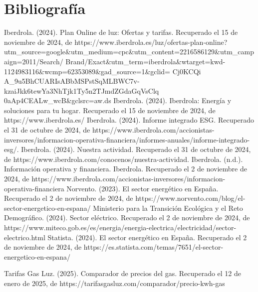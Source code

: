 \documentclass{article}
\begin{document}
\section{Bibliografía}
\begin{thebibliography}{9}
\bibitem{}
Iberdrola. (2024). Plan Online de luz: Ofertas y tarifas. Recuperado el 15 de noviembre de 2024, de https://www.iberdrola.es/luz/ofertas-plan-online?utm\_source=google\&utm\_medium=cpc\&utm\_content=2216586129\&utm\_campaign=2011/Search/
Brand/Exact\&utm\_term=iberdrola\&wtarget=kwd-1124983116\&wcmp=62353089\&gad\_source=1\&gclid=
Cj0KCQi
A\_9u5BhCUARIsABbMSPstSqMLBWC7v-kzaiJkk6tewYa3NhTjk1Ty5n2TJmdZGdaGqVsClq
0aAp4CEALw\_wcB\&gclsrc=aw.ds
\bibitem{}
Iberdrola. (2024). Iberdrola: Energía y soluciones para tu hogar. Recuperado el 15 de noviembre de 2024, de https://www.iberdrola.es/
Iberdrola. (2024). Informe integrado ESG. Recuperado el 31 de octubre de 2024, de https://www.iberdrola.com/accionistas-inversores/informacion-operativa-financiera/informes-anuales/informe-integrado-esg/. 
Iberdrola. (2024). Nuestra actividad. Recuperado el 31 de octubre de 2024, de https://www.iberdrola.com/conocenos/nuestra-actividad. 
Iberdrola. (n.d.). Información operativa y financiera. Iberdrola. Recuperado el 2 de noviembre de 2024, de https://www.iberdrola.com/accionistas-inversores/informacion-operativa-financiera
\bibitem{}
Norvento. (2023). El sector energético en España. Recuperado el 2 de noviembre de 2024, de https://www.norvento.com/blog/el-sector-energetico-en-espana/
\bibitem{}
Ministerio para la Transición Ecológica y el Reto Demográfico. (2024). Sector eléctrico. Recuperado el 2 de noviembre de 2024, de https://www.miteco.gob.es/es/energia/energia-electrica/electricidad/sector-electrico.html
\bibitem{}
Statista. (2024). El sector energético en España. Recuperado el 2 de noviembre de 2024, de https://es.statista.com/temas/7651/el-sector-energetico-en-espana/

\bibitem{}
Tarifas Gas Luz. (2025). Comparador de precios del gas. Recuperado el 12 de enero de 2025, de https://tarifasgasluz.com/comparador/precio-kwh-gas



\end{thebibliography}
\end{document}

